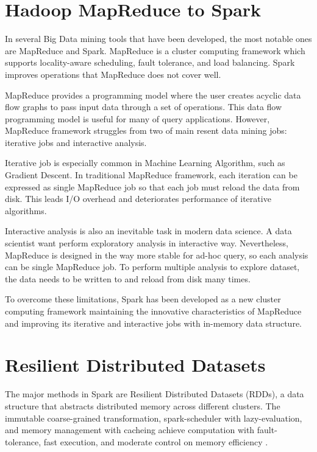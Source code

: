 \section{Hadoop MapReduce to Spark}
\label{sec:history}
In several Big Data mining tools that have been developed, the most notable ones are MapReduce and Spark. MapReduce is a cluster computing framework 
which supports locality-aware scheduling, fault tolerance, and load balancing. Spark improves operations that MapReduce does not cover well. 

MapReduce provides a programming model where the user creates acyclic data flow graphs to pass input data through a set of operations. This 
data flow programming model is useful for many of query applications. However, MapReduce framework struggles from two of main resent data mining jobs: iterative jobs and interactive analysis. 

Iterative job is especially common in Machine Learning Algorithm, such as Gradient Descent. In traditional MapReduce framework, each iteration can be expressed as single MapReduce job 
so that each job must reload the data from disk. This leads I/O overhead and deteriorates performance of iterative algorithms. 

Interactive analysis is also an inevitable task in modern data science. A data scientist want perform exploratory analysis in interactive way. 
Nevertheless, MapReduce is designed in the way more stable for ad-hoc query, so each analysis can be single MapReduce job. 
To perform multiple analysis to explore dataset, the data needs to be written to and reload from disk many times. 

To overcome these limitations, Spark has been developed as a new cluster computing framework maintaining the innovative characteristics of MapReduce and improving 
its iterative and interactive jobs with in-memory data structure.


\section{Resilient Distributed Datasets}
\label{sec:history}
The major methods in Spark are Resilient Distributed Datasets (RDDs), a data structure that abstracts distributed memory across different clusters. 
The immutable coarse-grained transformation, spark-scheduler with lazy-evaluation, and memory management with cacheing achieve computation with fault-tolerance, 
fast execution, and moderate control on memory efficiency \cite{DBLP:conf/nsdi/ZahariaCDDMMFSS12}.

